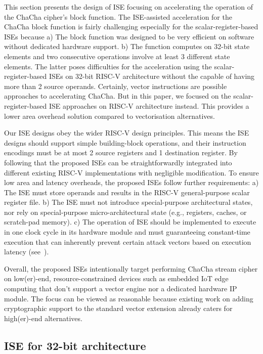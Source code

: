 
This section presents the design of ISE focusing on accelerating the operation of the ChaCha cipher's block function. 
The ISE-assisted acceleration for the ChaCha block function is fairly challenging especially for the scalar-register-based ISEs because 
a) The block function was designed to be very efficient on software without dedicated hardware support. 
b) The function computes on 32-bit state elements and two consecutive operations involve at least 3 different state elements. 
The latter poses difficulties for the acceleration using the scalar-register-based ISEs on 32-bit RISC-V architecture without the capable of having more than 2 source operands.
Certainly, vector instructions are possible approaches to accelerating ChaCha. 
But in this paper, we focused on the scalar-register-based ISE approaches on RISC-V architecture instead. 
This provides a lower area overhead solution compared to vectorisation alternatives. 

Our ISE designs obey the wider RISC-V design principles. 
This means the ISE designs should support simple building-block operations, and their instruction encodings must be at most 2 source registers and 1 destination register. 
By following that the proposed ISEs can be straightforwardly integrated into different existing RISC-V implementations with negligible modification.
To ensure low area and latency overheads, the proposed ISEs follow further requirements: 
a) The ISE must store operands and results in the RISC-V general-purpose scalar register file. 
b) The ISE must not introduce special-purpose architectural states, nor rely on special-purpose micro-architectural state (e.g., registers, caches, or scratch-pad memory).
c) The operation of ISE should be implemented to execute in one clock cycle in its hardware module and must guaranteeing constant-time execution that can  inherently prevent certain attack vectors based on execution latency (see~\cite[Section 4]{GYC:18}).

Overall, the proposed ISEs intentionally target performing ChaCha stream cipher on low(er)-end, resource-constrained devices such as embedded IoT edge computing that don't support a vector engine nor a dedicated hardware IP module. The focus can be viewed as reasonable because existing work on adding cryptographic support to the standard vector extension \cite{riscv:ext:vector:draft} already caters for high(er)-end alternatives. 

\subsection{ISE for 32-bit architecture}

